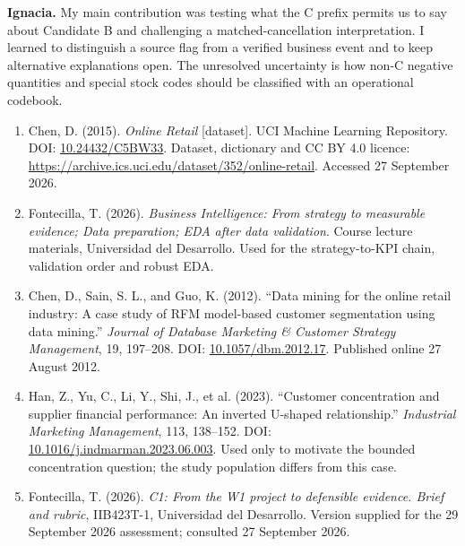 \documentclass[10pt,a4paper]{article}
\newcommand{\sectionhead}[1]{\Needspace{8\baselineskip}\vspace{0.33em}{\large\bfseries\color{navy}#1}\par\vspace{0.08em}}
\begin{document}
\textbf{Ignacia.} My main contribution was testing what the C prefix permits us to say about Candidate B and challenging a matched-cancellation interpretation. I learned to distinguish a source flag from a verified business event and to keep alternative explanations open. The unresolved uncertainty is how non-C negative quantities and special stock codes should be classified with an operational codebook.

\sectionhead{References}
\begingroup\small
\begin{enumerate}[leftmargin=1.4em,itemsep=0em,parsep=0em]
\item Chen, D. (2015). \emph{Online Retail} [dataset]. UCI Machine Learning Repository. DOI: \href{https://doi.org/10.24432/C5BW33}{10.24432/C5BW33}. Dataset, dictionary and CC BY 4.0 licence: \url{https://archive.ics.uci.edu/dataset/352/online-retail}. Accessed 27 September 2026.
\item Fontecilla, T. (2026). \emph{Business Intelligence: From strategy to measurable evidence; Data preparation; EDA after data validation}. Course lecture materials, Universidad del Desarrollo. Used for the strategy-to-KPI chain, validation order and robust EDA.
\item Chen, D., Sain, S. L., and Guo, K. (2012). ``Data mining for the online retail industry: A case study of RFM model-based customer segmentation using data mining.'' \emph{Journal of Database Marketing \& Customer Strategy Management}, 19, 197--208. DOI: \href{https://doi.org/10.1057/dbm.2012.17}{10.1057/dbm.2012.17}. Published online 27 August 2012.
\item Han, Z., Yu, C., Li, Y., Shi, J., et al. (2023). ``Customer concentration and supplier financial performance: An inverted U-shaped relationship.'' \emph{Industrial Marketing Management}, 113, 138--152. DOI: \href{https://doi.org/10.1016/j.indmarman.2023.06.003}{10.1016/j.indmarman.2023.06.003}. Used only to motivate the bounded concentration question; the study population differs from this case.
\item Fontecilla, T. (2026). \emph{C1: From the W1 project to defensible evidence. Brief and rubric}, IIB423T-1, Universidad del Desarrollo. Version supplied for the 29 September 2026 assessment; consulted 27 September 2026.
\end{enumerate}
\endgroup
\end{document}
